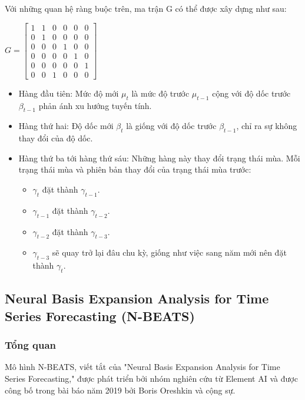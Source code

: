 \documentclass[conference]{IEEEtran}
\begin{document}
Với những quan hệ ràng buộc trên, ma trận G có thể được xây dựng như sau:\\
\begin{center}
    \(G=\begin{bmatrix}
        1 & 1 & 0 & 0 & 0 & 0 \\
        0 & 1 & 0 & 0 & 0 & 0 \\
        0 & 0 & 0 & 1 & 0 & 0 \\
        0 & 0 & 0 & 0 & 1 & 0 \\
        0 & 0 & 0 & 0 & 0 & 1 \\
        0 & 0 & 1 & 0 & 0 & 0
    \end{bmatrix}\)
\end{center}
\begin{itemize}
    \item Hàng đầu tiên: Mức độ mới \(\mu_{t}\) là mức độ trước \(\mu_{t-1}\) cộng với độ dốc trước \(\beta_{t-1}\) phản ánh xu hướng tuyến tính.
    \item Hàng thứ hai: Độ dốc mới \(\beta_{t}\) là giống với độ dốc trước \(\beta_{t-1}\), chỉ ra sự không thay đổi của độ dốc.
    \item Hàng thứ ba tới hàng thứ sáu: Những hàng này thay đổi trạng thái mùa. Mỗi trạng thái mùa và phiên bản thay đổi của trạng thái mùa trước:
          \begin{itemize}
              \item \(\gamma_{t}\) đặt thành \(\gamma_{t-1}\).
              \item \(\gamma_{t-1}\) đặt thành \(\gamma_{t-2}\).
              \item \(\gamma_{t-2}\) đặt thành \(\gamma_{t-3}\).
              \item \(\gamma_{t-3}\) sẽ quay trở lại đâu chu kỳ, giống như việc sang năm mới nên đặt thành \(\gamma_{t}\).
          \end{itemize}
\end{itemize}
\subsection{Neural Basis Expansion Analysis for Time Series Forecasting (N-BEATS)}
\vspace{1mm}
\subsubsection{Tổng quan}
Mô hình N-BEATS, viết tắt của "Neural Basis Expansion Analysis for Time Series Forecasting," được phát triển bởi nhóm nghiên cứu từ Element AI và được công bố trong bài báo năm 2019 bởi Boris Oreshkin và cộng sự.
\end{document}
